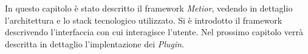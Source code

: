 In questo capitolo è stato descritto il framework \emph{Metior}, vedendo in dettaglio l'architettura e lo stack tecnologico utilizzato.
Si è introdotto il framework descrivendo l'interfaccia con cui interagisce l'utente.
Nel prossimo capitolo verrà descritta in dettaglio l'implentazione dei \emph{Plugin}.
